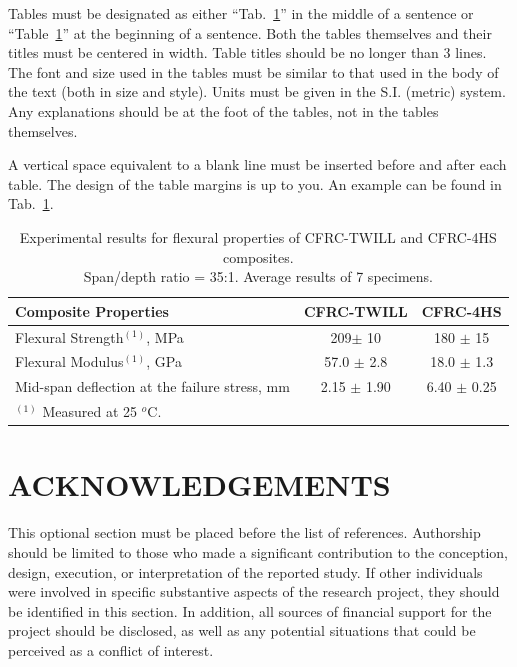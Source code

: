 \documentclass[10pt,fleqn,a4paper,twoside]{article}
\begin{document}
Tables must be designated as either ``Tab.~\ref{Tab:1}'' in the middle of a sentence or ``Table~\ref{Tab:1}'' at the beginning of a sentence. Both the tables themselves and their titles must be centered in width. Table titles should be no longer than 3 lines. The font and size used in the tables must be similar to that used in the body of the text (both in size and style). Units must be given in the S.I. (metric) system. Any explanations should be at the foot of the tables, not in the tables themselves.

A vertical space equivalent to a blank line must be inserted before and after each table. The design of the table margins is up to you. An example can be found in Tab.~\ref{Tab:1}.

\begin{table}[!h]
\centering
\caption{Experimental results for flexural properties of CFRC-TWILL and CFRC-4HS composites. \protect\\Span/depth ratio = 35:1. Average results of 7 specimens.}
\label{Tab:1}
\begin{tabular}{l|c|c}
\hline
\textbf{Composite Properties} & \textbf{CFRC-TWILL} & \textbf{CFRC-4HS}\\
\hline
Flexural Strength\footnotesize{$^{(1)}$}, MPa & 209$\pm$ 10 & 180 $\pm$  15\\
Flexural Modulus\footnotesize{$^{(1)}$}, GPa & 57.0 $\pm$ 2.8 & 18.0 $\pm$  1.3\\
Mid-span deflection at the failure stress, mm & 2.15 $\pm$  1.90 & 6.40 $\pm$  0.25\\
\hline
\multicolumn{3}{l}{\footnotesize{$^{(1)}$ Measured at 25 $^{o}$C.}}
\end{tabular}
\end{table}

\section{ACKNOWLEDGEMENTS}

This optional section must be placed before the list of references. Authorship should be limited to those who made a significant contribution to the conception, design, execution, or interpretation of the reported study. If other individuals were involved in specific substantive aspects of the research project, they should be identified in this section. In addition, all sources of financial support for the project should be disclosed, as well as any potential situations that could be perceived as a conflict of interest.
\end{document}
